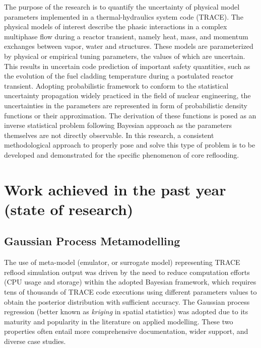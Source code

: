\documentclass[11pt,titlepage]{article}
\begin{document}
The purpose of the research is to quantify the uncertainty of 
physical model parameters implemented in a thermal-hydraulics system code
(TRACE). 
The physical models of interest describe the phasic interactions in a complex 
multiphase flow during a reactor transient, namely heat, mass, and momentum 
exchanges between vapor, water and structures. 
These models are parameterized 
by physical or empirical tuning parameters, the values of which are uncertain. 
This results in uncertain code prediction of important safety quantities, such 
as the evolution of the fuel cladding temperature during a postulated reactor 
transient.
Adopting probabilistic framework to conform to the statistical uncertainty 
propagation widely practiced in the field of nuclear engineering, 
the uncertainties in the parameters are represented in form of probabilistic 
density functions or their approximation. The derivation of these functions 
is posed as an inverse statistical problem following Bayesian approach as 
the parameters themselves are not directly observable. 
In this research, a consistent methodological approach to properly pose and
solve this type of problem is to be developed and demonstrated for the 
specific phenomenon of core reflooding.

\section{Work achieved in the past year (state of research)}

\subsection{Gaussian Process Metamodelling}

The use of meta-model (emulator, or surrogate model) representing TRACE reflood
simulation output was driven by the need to reduce computation efforts 
(CPU usage and storage) within the adopted Bayesian framework, which requires 
tens of thousands of TRACE code executions using different parameters 
values to obtain the posterior distribution with sufficient accuracy. 
The Gaussian process regression (better known as \emph{kriging} in spatial 
statistics) was adopted due to its maturity and popularity in the literature 
on applied modelling. These two properties often entail more comprehensive 
documentation, wider support, and diverse case studies.
\end{document}
